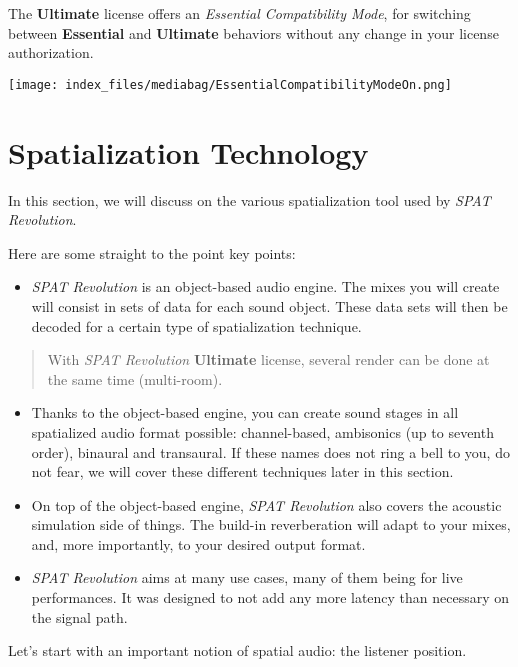\documentclass[
  letterpaper,
  DIV=11,
  numbers=noendperiod]{scrreport}
\providecommand{\tightlist}{%
  \setlength{\itemsep}{0pt}\setlength{\parskip}{0pt}}\usepackage{longtable,booktabs,array}
\begin{document}
The \textbf{Ultimate} license offers an \emph{Essential Compatibility
Mode}, for switching between \textbf{Essential} and \textbf{Ultimate}
behaviors without any change in your license authorization.

\texttt{[image: index\_files/mediabag/EssentialCompatibilityModeOn.png]}

\part{Spatialization Technology}

In this section, we will discuss on the various spatialization tool used
by \emph{SPAT Revolution}.

Here are some straight to the point key points:

\begin{itemize}
\tightlist
\item
  \emph{SPAT Revolution} is an object-based audio engine. The mixes you
  will create will consist in sets of data for each sound object. These
  data sets will then be decoded for a certain type of spatialization
  technique.
\end{itemize}

\begin{quote}
With \emph{SPAT Revolution} \textbf{Ultimate} license, several render
can be done at the same time (multi-room).
\end{quote}

\begin{itemize}
\tightlist
\item
  Thanks to the object-based engine, you can create sound stages in all
  spatialized audio format possible: channel-based, ambisonics (up to
  seventh order), binaural and transaural. If these names does not ring
  a bell to you, do not fear, we will cover these different techniques
  later in this section.
\item
  On top of the object-based engine, \emph{SPAT Revolution} also covers
  the acoustic simulation side of things. The build-in reverberation
  will adapt to your mixes, and, more importantly, to your desired
  output format.
\item
  \emph{SPAT Revolution} aims at many use cases, many of them being for
  live performances. It was designed to not add any more latency than
  necessary on the signal path.
\end{itemize}

Let's start with an important notion of spatial audio: the listener
position.
\end{document}
